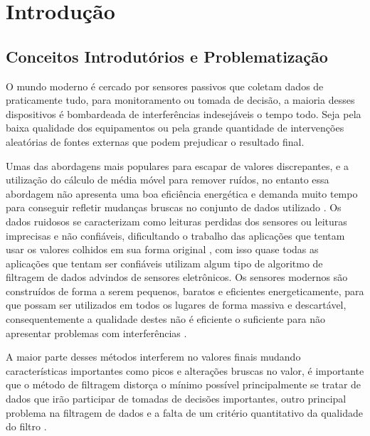 
\chapter{Introdução}\label{intro}
\section{Conceitos Introdutórios e Problematização}

O mundo moderno é cercado por sensores passivos que coletam dados de praticamente tudo, para monitoramento ou tomada de decisão, a maioria desses dispositivos é bombardeada de interferências indesejáveis o tempo todo. Seja pela baixa qualidade dos equipamentos ou pela grande quantidade de intervenções aleatórias de fontes externas que podem prejudicar o resultado final.

Umas das abordagens mais populares para escapar de valores discrepantes, e a utilização do cálculo de média móvel para remover ruídos, no entanto essa abordagem não apresenta uma boa eficiência energética e demanda muito tempo para conseguir refletir mudanças bruscas no conjunto de dados utilizado \cite{International_Conference__Zhuang}. 
Os dados ruidosos se caracterizam como leituras perdidas dos sensores ou leituras imprecisas e não confiáveis, dificultando o trabalho das aplicações que tentam usar os valores colhidos em sua forma original \cite{Jeffery_Pipelined_Framework}, com isso quase todas as aplicações que tentam ser confiáveis utilizam algum tipo de algoritmo de filtragem de dados advindos de sensores eletrônicos.
Os sensores modernos são construídos de forma a serem pequenos, baratos e eficientes energeticamente, para que possam ser utilizados em todos os lugares de forma massiva e descartável, consequentemente a qualidade destes não é eficiente o suficiente para não apresentar problemas com interferências \cite{tan2005sensoclean}.


A maior parte desses métodos interferem no valores finais mudando características importantes como picos e alterações bruscas no valor, é importante que o método de filtragem distorça o mínimo possível principalmente se tratar de dados que irão participar de tomadas de decisões importantes, outro principal problema na filtragem de dados e a falta de um critério quantitativo da qualidade do filtro \cite{kalambet2011noise}.



